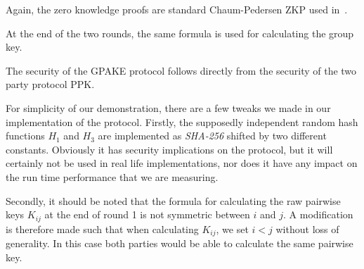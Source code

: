 Again, the zero knowledge proofs are standard Chaum-Pedersen ZKP used in~\cite{HaYiChSh15}.

At the end of the two rounds, the same formula is used for calculating the group key. 

The security of the GPAKE protocol follows directly from the security of the two party protocol PPK.

For simplicity of our demonstration, there are a few tweaks we made in our implementation of the
protocol. Firstly, the supposedly independent random hash functions $H_1$ and $H_3$ are implemented
as \textit{SHA-256} shifted by two different constants. Obviously it has security implications on the
protocol, but it will certainly not be used in real life implementations, nor does it have any impact on the
run time performance that we are measuring.

Secondly, it should be noted that the formula for calculating the raw pairwise keys $K_{ij}$ at the end of
round 1 is not symmetric between $i$ and $j$. A modification is therefore made such that when
calculating $K_{ij}$, we set $i < j$ without loss of generality. In this case both parties would be able to
calculate the same pairwise key.















